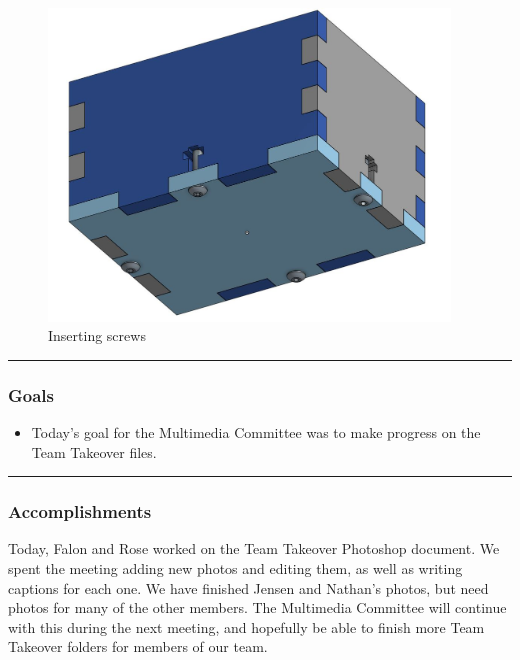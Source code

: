 \begin{figure}[htp]
\centering
\includegraphics[width=0.95\textwidth, angle=0]{Meetings/August/08-31-21/8-31-21_CAD_Image3 - Nathan Forrer.JPG}
\caption{Inserting screws}
\label{fig:083121_3}
\end{figure}


\noindent\hfil\rule{\textwidth}{.4pt}\hfil
\subsubsection*{Goals}
\begin{itemize}
    \item Today's goal for the Multimedia Committee was to make progress on the Team Takeover files.
  

\end{itemize} 

\noindent\hfil\rule{\textwidth}{.4pt}\hfil

\subsubsection*{Accomplishments}
Today, Falon and Rose worked on the Team Takeover Photoshop document. We spent the meeting adding new photos and editing them, as well as writing captions for each one. We have finished Jensen and Nathan's photos, but need photos for many of the other members. The Multimedia Committee will continue with this during the next meeting, and hopefully be able to finish more Team Takeover folders for members of our team.

